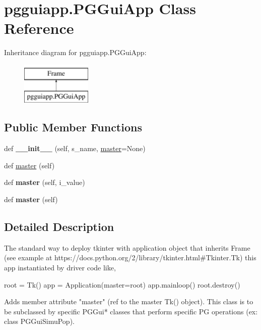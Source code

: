 \hypertarget{classpgguiapp_1_1PGGuiApp}{}\section{pgguiapp.\+P\+G\+Gui\+App Class Reference}
\label{classpgguiapp_1_1PGGuiApp}
Inheritance diagram for pgguiapp.\+P\+G\+Gui\+App\+:\begin{figure}[H]
\begin{center}
\leavevmode
\includegraphics[height=2.000000cm]{classpgguiapp_1_1PGGuiApp}
\end{center}
\end{figure}
\subsection*{Public Member Functions}
\begin{DoxyCompactItemize}
\item 
def {\bfseries \+\_\+\+\_\+init\+\_\+\+\_\+} (self, s\+\_\+name, \hyperlink{classpgguiapp_1_1PGGuiApp_abac82293710b7553c50772ac5b106754}{master}=None)\hypertarget{classpgguiapp_1_1PGGuiApp_ab4c3a5193c5b05b29a63b84e2ea5e219}{}\label{classpgguiapp_1_1PGGuiApp_ab4c3a5193c5b05b29a63b84e2ea5e219}

\item 
def \hyperlink{classpgguiapp_1_1PGGuiApp_abac82293710b7553c50772ac5b106754}{master} (self)
\item 
def {\bfseries master} (self, i\+\_\+value)\hypertarget{classpgguiapp_1_1PGGuiApp_a401a2ae1ac7590008a003497256bddb7}{}\label{classpgguiapp_1_1PGGuiApp_a401a2ae1ac7590008a003497256bddb7}

\item 
def {\bfseries master} (self)\hypertarget{classpgguiapp_1_1PGGuiApp_abac82293710b7553c50772ac5b106754}{}\label{classpgguiapp_1_1PGGuiApp_abac82293710b7553c50772ac5b106754}

\end{DoxyCompactItemize}


\subsection{Detailed Description}
\begin{DoxyVerb}The standard way to deploy tkinter with application object that inherits Frame
(see example at https://docs.python.org/2/library/tkinter.html#Tkinter.Tk)
this app instantiated by driver code like, 

root = Tk()
app = Application(master=root)
app.mainloop()
root.destroy()

Adds member attribute "master" (ref to the master Tk() object).
This class is to be subclassed by specific PGGui* classes that
perform specific PG operations (ex: class PGGuiSimuPop).
\end{DoxyVerb}
 


